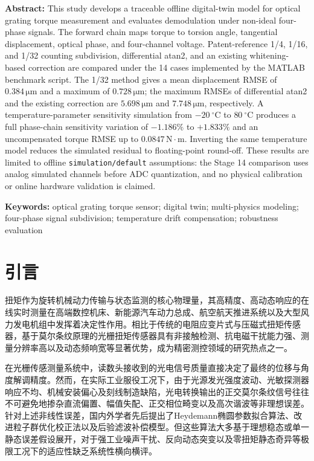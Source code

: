 \documentclass[UTF8,a4paper,12pt]{ctexart}
\newcommand{\enabstract}[1]{%
  \noindent\textbf{Abstract: }#1\par
}
\newcommand{\enkeywords}[1]{%
  \noindent\textbf{Keywords: }#1\par
}
\begin{document}
\enabstract{This study develops a traceable offline digital-twin model for optical grating torque measurement and evaluates demodulation under non-ideal four-phase signals. The forward chain maps torque to torsion angle, tangential displacement, optical phase, and four-channel voltage. Patent-reference 1/4, 1/16, and 1/32 counting subdivision, differential atan2, and an existing whitening-based correction are compared under the 14 cases implemented by the MATLAB benchmark script. The 1/32 method gives a mean displacement RMSE of $0.384\,\mathrm{\mu m}$ and a maximum of $0.728\,\mathrm{\mu m}$; the maximum RMSEs of differential atan2 and the existing correction are $5.698\,\mathrm{\mu m}$ and $7.748\,\mathrm{\mu m}$, respectively. A temperature-parameter sensitivity simulation from $-20~^\circ\mathrm{C}$ to $80~^\circ\mathrm{C}$ produces a full phase-chain sensitivity variation of $-1.186\%$ to $+1.833\%$ and an uncompensated torque RMSE up to $0.0847\,\mathrm{N\cdot m}$. Inverting the same temperature model reduces the simulated residual to floating-point round-off. These results are limited to offline \texttt{simulation/default} assumptions: the Stage 14 comparison uses analog simulated channels before ADC quantization, and no physical calibration or online hardware validation is claimed.}

\vspace{0.4em}
\enkeywords{optical grating torque sensor; digital twin; multi-physics modeling; four-phase signal subdivision; temperature drift compensation; robustness evaluation}

\vspace{1em}

\section*{引言}

扭矩作为旋转机械动力传输与状态监测的核心物理量，其高精度、高动态响应的在线实时测量在高端数控机床、新能源汽车动力总成、航空航天推进系统以及大型风力发电机组中发挥着决定性作用。相比于传统的电阻应变片式与压磁式扭矩传感器，基于莫尔条纹原理的光栅扭矩传感器具有非接触检测、抗电磁干扰能力强、测量分辨率高以及动态频响宽等显著优势，成为精密测控领域的研究热点之一\cite{ref1,ref2}。

在光栅传感测量系统中，读数头接收到的光电信号质量直接决定了最终的位移与角度解调精度\cite{ref3,ref4}。然而，在实际工业服役工况下，由于光源发光强度波动、光敏探测器响应不均、机械安装偏心及刻线制造缺陷，光电转换输出的正交莫尔条纹信号往往不可避免地掺杂直流偏置、幅值失配、正交相位畸变以及高次谐波等非理想误差\cite{ref5,ref6}。针对上述非线性误差，国内外学者先后提出了Heydemann椭圆参数拟合算法\cite{ref9}、改进粒子群优化校正法\cite{ref8}以及后验滤波补偿模型\cite{ref11}。但这些算法大多基于理想稳态或单一静态误差假设展开，对于强工业噪声干扰、反向动态突变以及零扭矩静态奇异等极限工况下的适应性缺乏系统性横向横评。
\end{document}
